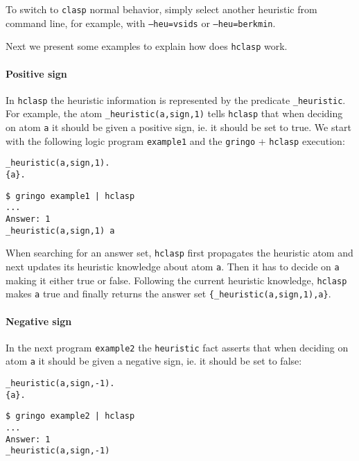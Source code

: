 To switch to \texttt{clasp} normal behavior, simply select another heuristic from command line,  for example, with \texttt{--heu=vsids} or \texttt{--heu=berkmin}. 

 Next we present some examples to explain how does \texttt{hclasp} work. 



\paragraph{Positive sign}

 In \texttt{hclasp} the heuristic information is represented by the predicate \texttt{\_heuristic}.  For example, the atom \texttt{\_heuristic(a,sign,1)} tells \texttt{hclasp} that  when deciding on atom \texttt{a} it should be given a positive sign,   ie. it should be set to true.  We start with the following logic program \texttt{example1} and the \texttt{gringo} + \texttt{hclasp} execution:
\begin{verbatim}
_heuristic(a,sign,1).
{a}.
\end{verbatim}
\begin{verbatim}
$ gringo example1 | hclasp
...
Answer: 1    
_heuristic(a,sign,1) a
\end{verbatim}

 When searching for an answer set, \texttt{hclasp} first propagates the heuristic atom and next updates its heuristic knowledge about atom \texttt{a}. Then it has to decide on \texttt{a} making it either true or false. Following the current heuristic knowledge,  \texttt{hclasp} makes \texttt{a} true and finally returns the answer set \texttt{\{\_heuristic(a,sign,1),a\}}. 


\paragraph{Negative sign}

In the next program \texttt{example2} the \texttt{heuristic} fact  asserts that when deciding on atom \texttt{a}  it should be given a negative sign, ie. it should be set to false: 
\begin{verbatim}
_heuristic(a,sign,-1).
{a}.
\end{verbatim}
\begin{verbatim}
$ gringo example2 | hclasp                                                                                 
...
Answer: 1                                                                                                           
_heuristic(a,sign,-1)
\end{verbatim}

